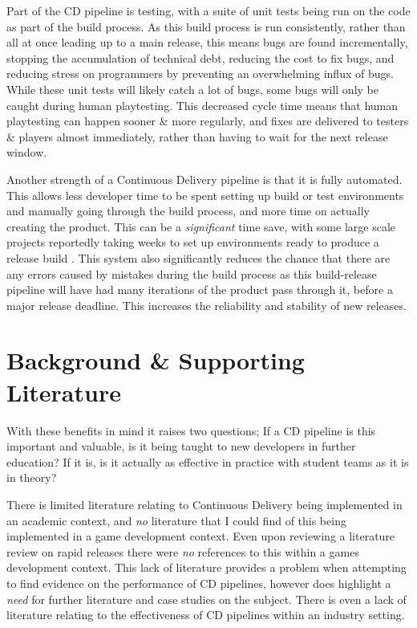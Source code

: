 \documentclass[lettersize,journal]{IEEEtran}
\begin{document}
        Part of the CD pipeline is testing, with a suite of unit tests being run on the code as part of the build process. As this build process is run consistently, rather than all at once leading up to a main release, this means bugs are found incrementally, stopping the accumulation of technical debt, reducing the cost to fix bugs, and reducing stress on programmers by preventing an overwhelming influx of bugs. While these unit tests will likely catch a lot of bugs, some bugs will only be caught during human playtesting. This decreased cycle time means that human playtesting can happen sooner \& more regularly, and fixes are delivered to testers \& players almost immediately, rather than having to wait for the next release window.
        
        Another strength of a Continuous Delivery pipeline is that it is fully automated. This allows less developer time to be spent setting up build or test environments and manually going through the build process, and more time on actually creating the product. This can be a \textit{significant} time save, with some large scale projects reportedly taking weeks to set up environments ready to produce a release build \cite{paddy, ContDelIntro}. This system also significantly reduces the chance that there are any errors caused by mistakes during the build process as this build-release pipeline will have had many iterations of the product pass through it, before a major release deadline. This increases the reliability and stability of new releases.
    
\section{Background \& Supporting Literature}
    With these benefits in mind it raises two questions; If a CD pipeline is this important and valuable, is it being taught to new developers in further education? If it is, is it actually as effective in practice with student teams as it is in theory?

    There is limited literature relating to Continuous Delivery being implemented in an academic context, and \textit{no} literature that I could find of this being implemented in a game development context. Even upon reviewing a literature review on rapid releases \cite{mantyla2015rapid} there were \textit{no} references to this within a games development context. This lack of literature provides a problem when attempting to find evidence on the performance of CD pipelines, however does highlight a \textit{need} for further literature and case studies on the subject. There is even a lack of literature relating to the effectiveness of CD pipelines within an industry setting. 
    
\end{document}
